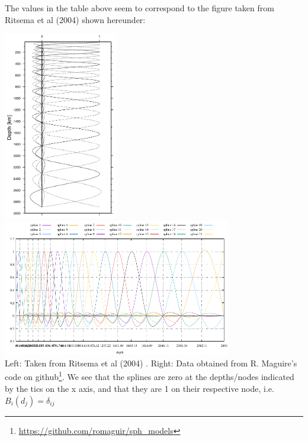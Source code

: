 The values in the table above seem to correspond to the figure taken from 
Ritsema et al (2004) \cite{rivw04} shown hereunder: 
\begin{center}
\includegraphics[width=5cm]{python_codes/fieldstone_85/images/rivw04splines}
\includegraphics[width=10cm]{python_codes/fieldstone_85/splines/splines.pdf}\\
{\captionfont Left: Taken from Ritsema et al (2004) \cite{rivw04}.
Right: Data obtained from R. Maguire's code on github\footnote{\url{https://github.com/romaguir/sph_models}}.
We see that the splines are zero at the depths/nodes 
indicated by the tics on the x axis, and that 
they are 1 on their respective node, i.e. $B_i(d_j)=\delta_{ij}$}
\end{center}


